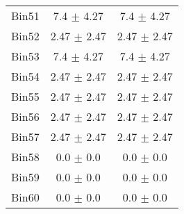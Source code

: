 \begin{tabular}{|c|c|c|}
     Bin51 & 7.4 $\pm$ 4.27 & 7.4 $\pm$ 4.27 \\ \cline{1-3} 
     Bin52 & 2.47 $\pm$ 2.47 & 2.47 $\pm$ 2.47 \\ \cline{1-3} 
     Bin53 & 7.4 $\pm$ 4.27 & 7.4 $\pm$ 4.27 \\ \cline{1-3} 
     Bin54 & 2.47 $\pm$ 2.47 & 2.47 $\pm$ 2.47 \\ \cline{1-3} 
     Bin55 & 2.47 $\pm$ 2.47 & 2.47 $\pm$ 2.47 \\ \cline{1-3} 
     Bin56 & 2.47 $\pm$ 2.47 & 2.47 $\pm$ 2.47 \\ \cline{1-3} 
     Bin57 & 2.47 $\pm$ 2.47 & 2.47 $\pm$ 2.47 \\ \cline{1-3} 
     Bin58 & 0.0 $\pm$ 0.0 & 0.0 $\pm$ 0.0 \\ \cline{1-3} 
     Bin59 & 0.0 $\pm$ 0.0 & 0.0 $\pm$ 0.0 \\ \cline{1-3} 
     Bin60 & 0.0 $\pm$ 0.0 & 0.0 $\pm$ 0.0 \\ \cline{1-3} 
  \end{tabular}
